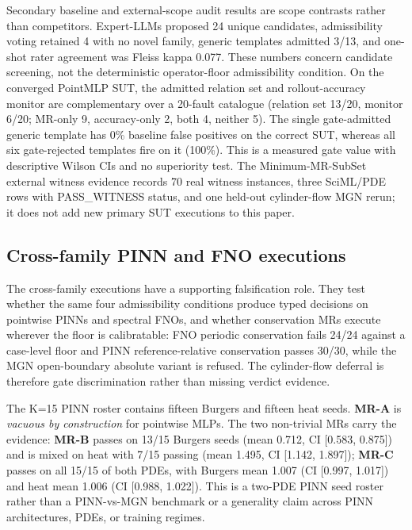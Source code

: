 \documentclass[preprint,12pt]{elsarticle}
\begin{document}
Secondary baseline and external-scope audit results are scope contrasts rather than competitors. Expert-LLMs proposed 24 unique candidates, admissibility voting retained 4 with no novel family, generic templates admitted 3/13, and one-shot rater agreement was Fleiss kappa 0.077. These numbers concern candidate screening, not the deterministic operator-floor admissibility condition. On the converged PointMLP SUT, the admitted relation set and rollout-accuracy monitor are complementary over a 20-fault catalogue (relation set 13/20, monitor 6/20; MR-only 9, accuracy-only 2, both 4, neither 5). The single gate-admitted generic template has 0\% baseline false positives on the correct SUT, whereas all six gate-rejected templates fire on it (100\%). This is a measured gate value with descriptive Wilson CIs and no superiority test. The Minimum-MR-SubSet external witness evidence records 70 real witness instances, three SciML/PDE rows with PASS\_WITNESS status, and one held-out cylinder-flow MGN rerun; it does not add new primary SUT executions to this paper.

\subsection{Cross-family PINN and FNO executions}
\label{subsec:pinn-extension}

The cross-family executions have a supporting falsification role. They test whether the same four admissibility conditions produce typed decisions on pointwise PINNs and spectral FNOs, and whether conservation MRs execute wherever the floor is calibratable: FNO periodic conservation fails 24/24 against a case-level floor and PINN reference-relative conservation passes 30/30, while the MGN open-boundary absolute variant is refused. The cylinder-flow deferral is therefore gate discrimination rather than missing verdict evidence.

The K=15 PINN roster contains fifteen Burgers and fifteen heat seeds. \textbf{MR-A} is \emph{vacuous by construction} for pointwise MLPs. The two non-trivial MRs carry the evidence: \textbf{MR-B} passes on 13/15 Burgers seeds (mean 0.712, CI [0.583, 0.875]) and is mixed on heat with 7/15 passing (mean 1.495, CI [1.142, 1.897]); \textbf{MR-C} passes on all 15/15 of both PDEs, with Burgers mean 1.007 (CI [0.997, 1.017]) and heat mean 1.006 (CI [0.988, 1.022]). This is a two-PDE PINN seed roster rather than a PINN-vs-MGN benchmark or a generality claim across PINN architectures, PDEs, or training regimes.
\end{document}
